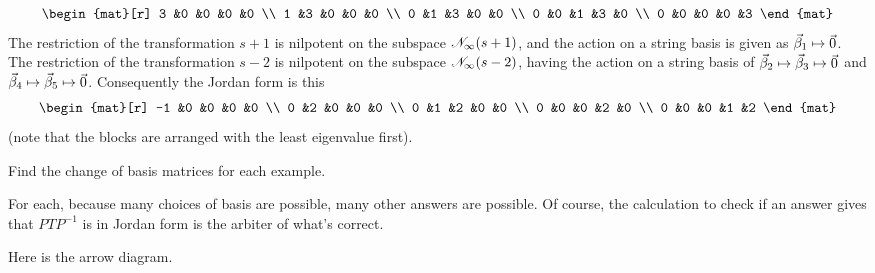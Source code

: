 \begin{exercises}
\begin{answer}
\begin{exparts}
\begin{equation*}
\begin{mat}[r]
               3  &0  &0  &0  &0  \\
               1  &3  &0  &0  &0  \\
               0  &1  &3  &0  &0  \\
               0  &0  &1  &3  &0  \\
               0  &0  &0  &0  &3
             \end{mat}
         \end{equation*} 
         \partsitem The restriction of the transformation $s+1$ is nilpotent
          on the subspace $\mathscr{N}_\infty(s+1)$, and the action on a 
          string basis is given as $\vec{\beta}_1\mapsto\vec{0}$.  
          The restriction of the transformation $s-2$ is nilpotent
          on the subspace $\mathscr{N}_\infty(s-2)$, having the action on a 
          string basis of $\vec{\beta}_2\mapsto\vec{\beta}_3\mapsto\vec{0}$
          and $\vec{\beta}_4\mapsto\vec{\beta}_5\mapsto\vec{0}$.        
          Consequently the Jordan form is this
          \begin{equation*}
            \begin{mat}[r]
              -1  &0  &0  &0  &0  \\
               0  &2  &0  &0  &0  \\
               0  &1  &2  &0  &0  \\
               0  &0  &0  &2  &0  \\
               0  &0  &0  &1  &2
             \end{mat} 
          \end{equation*}
          (note that the blocks are arranged with the least eigenvalue first).
      \end{exparts}  
    \end{answer}
  \item 
    Find the change of basis matrices for each example. 
    \begin{exparts*}
      \partsitem {}
      \partsitem {}
      \partsitem {}
    \end{exparts*}
    \begin{answer}
      For each, because many choices of basis are possible, many other 
      answers are possible.
      Of course, the calculation to check if an answer gives that $PTP^{-1}$
      is in Jordan form is the arbiter of what's correct.
      \begin{exparts}
        \partsitem Here is the arrow diagram.
          \begin{equation*}

\end{equation*}
\end{exparts}
\end{answer}
\end{exercises}
